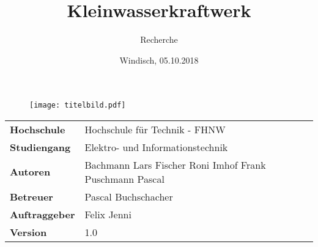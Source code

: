 \documentclass[final]{fhnwreport}       %
\title{Kleinwasserkraftwerk}          %
\author{Recherche}          %
\date{Windisch, 05.10.2018}             %
\begin{document}
\maketitle

\vspace*{-1cm}						    %
\vfill
\begin{figure}[H]
\centering
\texttt{[image: titelbild.pdf]}
\end{figure}
\vfill

{
\renewcommand\arraystretch{2}
\begin{center}
\begin{tabular}{ >{\bf} l p{10cm} l }
Hochschule                 &   Hochschule für Technik - FHNW\\
Studiengang               &  	Elektro- und Informationstechnik\\
Autoren   		           	& 	Bachmann Lars \newline  Fischer Roni \newline Imhof Frank \newline Puschmann Pascal\\ 
Betreuer                   	&    Pascal Buchschacher\\
Auftraggeber             	&    Felix Jenni\\
Version                    	&    1.0 %
\end{tabular}
\end{center}
}

\clearpage
{}				%
\thispagestyle{empty}
			
\tableofcontents
\clearpage








{%
}
\end{document}
